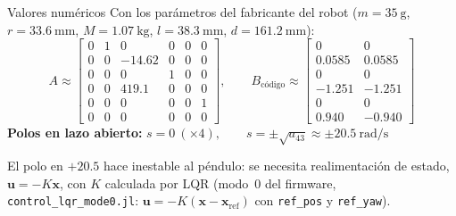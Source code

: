 \documentclass[10pt,aspectratio=169]{beamer}
\newcommand{\vx}{\mathbf{x}}
\newcommand{\vu}{\mathbf{u}}
\newcommand{\rf}{\text{ref}}
\begin{document}
\begin{frame}{Valores numéricos}
\small
Con los parámetros del fabricante del robot
($m=\SI{35}{\gram}$, $r=\SI{33.6}{\milli\meter}$, $M=\SI{1.07}{\kilo\gram}$,
$l=\SI{38.3}{\milli\meter}$, $d=\SI{161.2}{\milli\meter}$):
\[
A\approx\begin{bmatrix}
0&1&0&0&0&0\\
0&0&-14.62&0&0&0\\
0&0&0&1&0&0\\
0&0&419.1&0&0&0\\
0&0&0&0&0&1\\
0&0&0&0&0&0
\end{bmatrix},
\qquad
B_{\text{código}}\approx\begin{bmatrix}
0&0\\ 0.0585&0.0585\\ 0&0\\ -1.251&-1.251\\ 0&0\\ 0.940&-0.940
\end{bmatrix}
\]
\textbf{Polos en lazo abierto:}\quad
$s=0\ (\times4),\qquad s=\pm\sqrt{a_{43}}\approx\pm\SI{20.5}{\radian\per\second}$

\medskip
\alert{El polo en $+20.5$ hace inestable al péndulo:} se necesita
realimentación de estado, $\vu=-K\vx$, con $K$ calculada por LQR
(modo~0 del firmware, \texttt{control\_lqr\_mode0.jl}: $\vu=-K(\vx-\vx_\rf)$ con
\texttt{ref\_pos} y \texttt{ref\_yaw}).
\end{frame}
\end{document}
